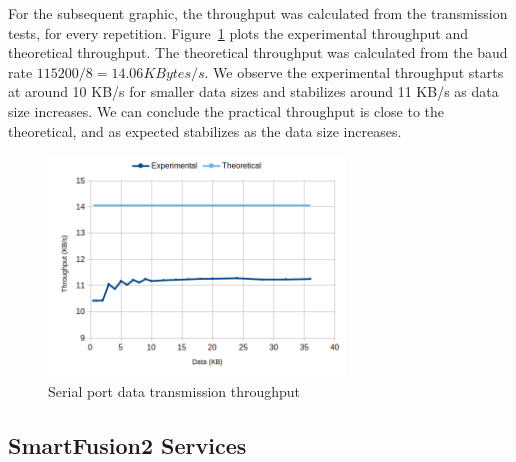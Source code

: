 For the subsequent graphic, the throughput was calculated from the transmission tests, for every repetition.
Figure~\ref{fig:comms:tput} plots the experimental throughput and theoretical throughput. The theoretical throughput was calculated from the baud rate \(115200/8 = 14.06 KBytes/s\).
We observe the experimental throughput starts at around 10 KB/s for smaller data sizes and stabilizes around 11 KB/s as data size increases.
We can conclude the practical throughput is close to the theoretical, and as expected stabilizes as the data size increases.

\begin{figure}[h!]
	\centering
	\includegraphics[width=0.7\textwidth]{./Images/comms-tput.png}
	\caption{Serial port data transmission throughput}
	\label{fig:comms:tput}
\end{figure}

\subsection{SmartFusion2 Services}\label{chap:evaluation:board}


